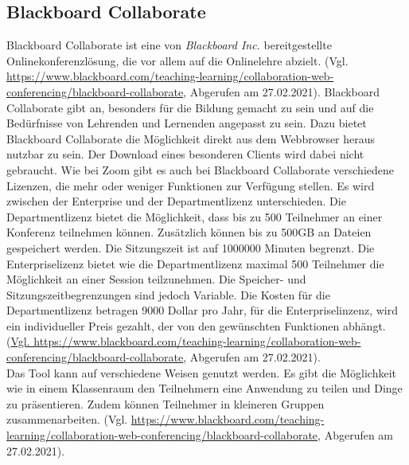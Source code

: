 \subsection{Blackboard Collaborate}
Blackboard Collaborate ist eine von \textit{Blackboard Inc.} bereitgestellte Onlinekonferenzlösung, die vor allem auf die Onlinelehre abzielt.
(Vgl. \url{https://www.blackboard.com/teaching-learning/collaboration-web-conferencing/blackboard-collaborate}, Abgerufen am 27.02.2021).
Blackboard Collaborate gibt an, besonders für die Bildung gemacht zu sein und auf die Bedürfnisse von Lehrenden und Lernenden angepasst zu sein.
Dazu bietet Blackboard Collaborate die Möglichkeit direkt aus dem Webbrowser heraus nutzbar zu sein.
Der Download eines besonderen Clients wird dabei nicht gebraucht.
Wie bei Zoom gibt es auch bei Blackboard Collaborate verschiedene Lizenzen, die mehr oder weniger Funktionen zur Verfügung stellen.
Es wird zwischen der Enterprise und der Departmentlizenz unterschieden.
Die Departmentlizenz bietet die Möglichkeit, dass bis zu 500 Teilnehmer an einer Konferenz teilnehmen können.
Zusätzlich können bis zu 500GB an Dateien gespeichert werden. Die Sitzungszeit ist auf 1000000 Minuten begrenzt.
Die Enterpriselizenz bietet wie die Departmentlizenz maximal 500 Teilnehmer die Möglichkeit an einer Session teilzunehmen.
Die Speicher- und Sitzungszeitbegrenzungen sind jedoch Variable.
Die Kosten für die Departmentlizenz betragen 9000 Dollar pro Jahr, für die Enterpriselinzenz, wird ein individueller Preis gezahlt, der von den gewünschten Funktionen abhängt.
(\url{Vgl. https://www.blackboard.com/teaching-learning/collaboration-web-conferencing/blackboard-collaborate}, Abgerufen am 27.02.2021).
\\
Das Tool kann auf verschiedene Weisen genutzt werden.
Es gibt die Möglichkeit wie in einem Klassenraum den Teilnehmern eine Anwendung zu teilen und Dinge zu präsentieren.
Zudem können Teilnehmer in kleineren Gruppen zusammenarbeiten.
(Vgl. \url{https://www.blackboard.com/teaching-learning/collaboration-web-conferencing/blackboard-collaborate}, Abgerufen am 27.02.2021).
\\


